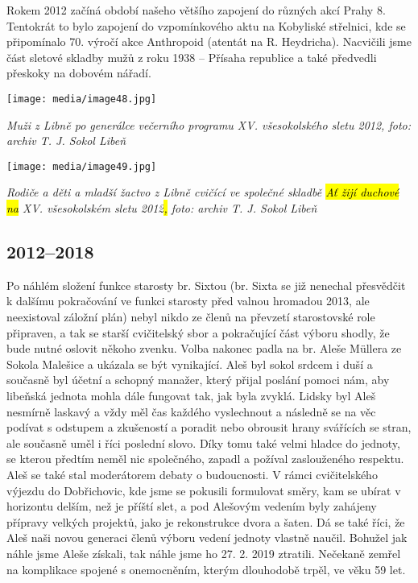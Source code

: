Rokem 2012 začíná období našeho většího zapojení do různých akcí Prahy
8. Tentokrát to bylo zapojení do vzpomínkového aktu na Kobyliské
střelnici, kde se připomínalo 70. výročí akce Anthropoid (atentát na R.
Heydricha). Nacvičili jsme část sletové skladby mužů z roku 1938 --
Přísaha republice a také předvedli přeskoky na dobovém nářadí.

\texttt{[image: media/image48.jpg]}

\emph{Muži z Libně po generálce večerního programu XV. všesokolského
sletu 2012, foto: archiv T. J. Sokol Libeň}

\texttt{[image: media/image49.jpg]}

\emph{Rodiče a děti a mladší žactvo z Libně cvičící ve společné skladbě
\hl{Ať žijí duchové na} XV. všesokolském sletu 2012\hl{,} foto: archiv
T. J. Sokol Libeň}

\subsection{\texorpdfstring{2012--2018 }{2012--2018 }}\label{section-2}

Po náhlém složení funkce starosty br. Sixtou (br. Sixta se již nenechal
přesvědčit k dalšímu pokračování ve funkci starosty před valnou hromadou
2013, ale neexistoval záložní plán) nebyl nikdo ze členů na převzetí
starostovské role připraven, a tak se starší cvičitelský sbor a
pokračující část výboru shodly, že bude nutné oslovit někoho zvenku.
Volba nakonec padla na br. Aleše Müllera ze Sokola Malešice a ukázala se
být vynikající. Aleš byl sokol srdcem i duší a současně byl účetní a
schopný manažer, který přijal poslání pomoci nám, aby libeňská jednota
mohla dále fungovat tak, jak byla zvyklá. Lidsky byl Aleš nesmírně
laskavý a vždy měl čas každého vyslechnout a následně se na věc podívat
s odstupem a zkušeností a poradit nebo obrousit hrany svářících se
stran, ale současně uměl i říci poslední slovo. Díky tomu také velmi
hladce do jednoty, se kterou předtím neměl nic společného, zapadl a
požíval zaslouženého respektu. Aleš se také stal moderátorem debaty o
budoucnosti. V rámci cvičitelského výjezdu do Dobřichovic, kde jsme se
pokusili formulovat směry, kam se ubírat v horizontu delším, než je
příští slet, a pod Alešovým vedením byly zahájeny přípravy velkých
projektů, jako je rekonstrukce dvora a šaten. Dá se také říci, že Aleš
naši novou generaci členů výboru vedení jednoty vlastně naučil. Bohužel
jak náhle jsme Aleše získali, tak náhle jsme ho 27. 2. 2019 ztratili.
Nečekaně zemřel na komplikace spojené s onemocněním, kterým dlouhodobě
trpěl, ve věku 59 let.

